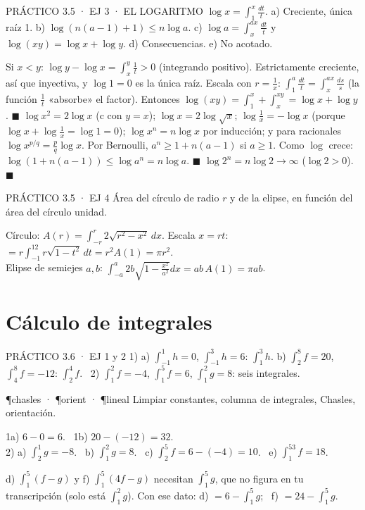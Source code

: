 \begin{enunciado}{PRÁCTICO 3.5 · EJ 3 · EL LOGARITMO}
$\log x=\int_1^x\frac{dt}t$. a) Creciente, única raíz 1. b) $\log(n(a-1)+1)\le n\log a$. c) $\log a=\int_x^{ax}\frac{dt}t$ y $\log(xy)=\log x+\log y$. d) Consecuencias. e) No acotado.
\end{enunciado}
Si $x<y$: $\log y-\log x=\int_x^y\frac1t>0$ (integrando positivo). Estrictamente creciente, así que inyectiva, y $\log1=0$ es la única raíz.
Escala con $r=\frac1x$: $\int_1^a\frac{dt}t=\int_x^{ax}\frac{ds}s$ (la función $\frac1t$ «absorbe» el factor). Entonces $\log(xy)=\int_1^x+\int_x^{xy}=\log x+\log y$. $\blacksquare$
$\log x^2=2\log x$ (c con $y=x$); $\log x=2\log\sqrt x$; $\log\frac1x=-\log x$ (porque $\log x+\log\frac1x=\log1=0$); $\log x^n=n\log x$ por inducción; y para racionales $\log x^{p/q}=\frac pq\log x$.
Por Bernoulli, $a^n\ge1+n(a-1)$ si $a\ge1$. Como $\log$ crece: $\log(1+n(a-1))\le\log a^n=n\log a$. $\blacksquare$
$\log2^n=n\log2\to\infty$ ($\log2>0$). $\blacksquare$

\begin{enunciado}{PRÁCTICO 3.5 · EJ 4}
Área del círculo de radio $r$ y de la elipse, en función del área del círculo unidad.
\end{enunciado}
Círculo: $A(r)=\int_{-r}^r2\sqrt{r^2-x^2}\,dx$. Escala $x=rt$: $=r\int_{-1}^12r\sqrt{1-t^2}\,dt=r^2A(1)=\pi r^2$.\\
Elipse de semiejes $a,b$: $\int_{-a}^a2b\sqrt{1-\frac{x^2}{a^2}}dx=ab\,A(1)=\pi ab$.

\section{Cálculo de integrales}

\begin{enunciado}{PRÁCTICO 3.6 · EJ 1 y 2}
1) a) $\int_{-1}^1h=0$, $\int_{-1}^3h=6$: $\int_1^3h$. b) $\int_2^8f=20$, $\int_4^8f=-12$: $\int_2^4f$. \ 2) $\int_1^2f=-4$, $\int_1^5f=6$, $\int_1^2g=8$: seis integrales.
\end{enunciado}
\begin{uso}{\P{chasles} · \P{orient} · \P{lineal}}
Limpiar constantes, columna de integrales, Chasles, orientación.
\end{uso}
1a) $6-0=6$. \ 1b) $20-(-12)=32$.\\
2) a) $\int_2^1g=-8$. \ b) $\int_1^2g=8$. \ c) $\int_2^5f=6-(-4)=10$. \ e) $\int_1^53f=18$.
\begin{falta}
d) $\int_1^5(f-g)$ y f) $\int_1^5(4f-g)$ necesitan $\int_1^5g$, que no figura en tu transcripción (solo está $\int_1^2g$). Con ese dato: d) $=6-\int_1^5g$; \ f) $=24-\int_1^5g$.
\end{falta}

